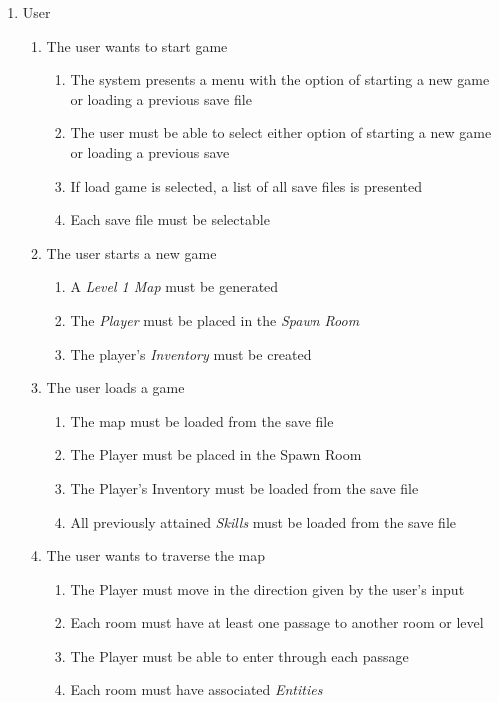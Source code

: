 \documentclass[12pt, titlepage]{article}
\begin{document}
\begin{enumerate}[{VP}1.]
  \item User
  \begin{enumerate}[{BE1}.1]
    \item The user wants to start game
    \begin{enumerate}
      \item The system presents a menu with the option of starting a new game or loading a previous save file
      \item The user must be able to select either option of starting a new game or loading a previous save
      \item If load game is selected, a list of all save files is presented
      \item Each save file must be selectable
    \end{enumerate}
    \item The user starts a new game
    \begin{enumerate}
      \item A \textit{Level 1 Map} must be generated
      \item The \textit{Player} must be placed in the \textit{Spawn Room}
      \item The player's \textit{Inventory} must be created
    \end{enumerate}
    \item The user loads a game
    \begin{enumerate}
      \item The map must be loaded from the save file
      \item The Player must be placed in the Spawn Room
      \item The Player's Inventory must be loaded from the save file
      \item All previously attained \textit{Skills} must be loaded from the save file
    \end{enumerate}
    \item The user wants to traverse the map
    \begin{enumerate}
      \item The Player must move in the direction given by the user's input
      \item Each room must have at least one passage to another room or level
      \item The Player must be able to enter through each passage
      \item Each room must have associated \textit{Entities}

\end{enumerate}
\end{enumerate}
\end{enumerate}
\end{document}
